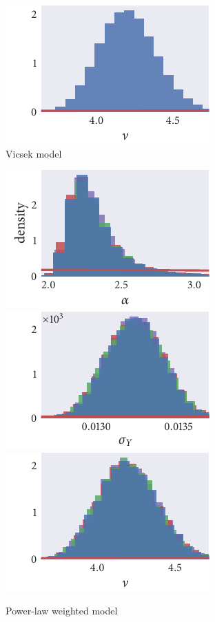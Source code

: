 \begin{figure}[p]
\begin{subfigure}[b]{\textwidth}
    \includegraphics{seq2/r_hist_nu.pdf}
    \caption{Vicsek model}
  \end{subfigure}
  \begin{subfigure}[b]{\textwidth}
    \includegraphics{seq2/power_hist_alpha.pdf}%
    \includegraphics{seq2/power_hist_sigma_Y.pdf}%
    \includegraphics{seq2/power_hist_nu.pdf}
    \caption{Power-law weighted model}
  \end{subfigure}
  \begin{subfigure}[b]{\textwidth}

\end{subfigure}
\end{figure}
